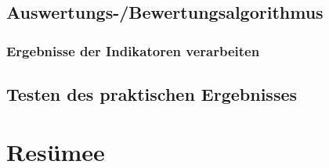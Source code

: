 \documentclass[12pt]{article}
\begin{document}
\subsection{Auswertungs-/Bewertungsalgorithmus}
	\subsubsection{Ergebnisse der Indikatoren verarbeiten}
\subsection{Testen des praktischen Ergebnisses}
\section{Resümee}

\nocite{*}
\printbibliography[heading=bibintoc,title=Literaturverzeichnis,notkeyword={picture}]
\printbibliography[heading=bibintoc,title=Bildverzeichnis,keyword={picture}]
\end{document}
